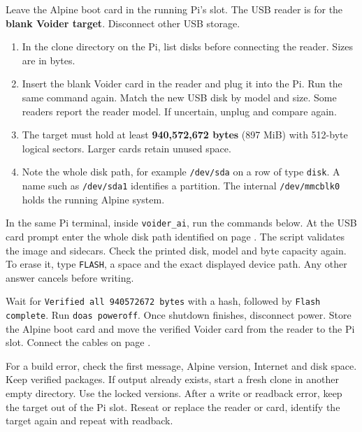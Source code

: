 Leave the Alpine boot card in the running Pi's slot. The USB reader is for the \textbf{blank Voider target}. Disconnect other USB storage.

\begin{enumerate}
\item In the clone directory on the Pi, list disks before connecting the reader. Sizes are in bytes.
\listCards
\item Insert the blank Voider card in the reader and plug it into the Pi. Run the same command again. Match the new USB disk by model and size. Some readers report the reader model. If uncertain, unplug and compare again.
\item The target must hold at least \textbf{940,572,672 bytes} (897 MiB) with 512-byte logical sectors. Larger cards retain unused space.
\item Note the whole disk path, for example \texttt{/dev/sda} on a row of type \texttt{disk}. A name such as \texttt{/dev/sda1} identifies a partition. The internal \texttt{/dev/mmcblk0} holds the running Alpine system.
\end{enumerate}

In the same Pi terminal, inside \texttt{voider\_ai}, run the commands below. At the USB card prompt enter the whole disk path identified on page \pageref{en:target}.
\flashCommands
The script validates the image and sidecars. Check the printed disk, model and byte capacity again. To erase it, type \texttt{FLASH}, a space and the exact displayed device path. Any other answer cancels before writing.

Wait for \texttt{Verified all 940572672 bytes} with a hash, followed by \texttt{Flash complete}. Run \texttt{doas poweroff}. Once shutdown finishes, disconnect power. Store the Alpine boot card and move the verified Voider card from the reader to the Pi slot. Connect the cables on page \pageref{en:wire}.

For a build error, check the first message, Alpine version, Internet and disk space. Keep verified packages. If output already exists, start a fresh clone in another empty directory. Use the locked versions. After a write or readback error, keep the target out of the Pi slot. Reseat or replace the reader or card, identify the target again and repeat with readback.

